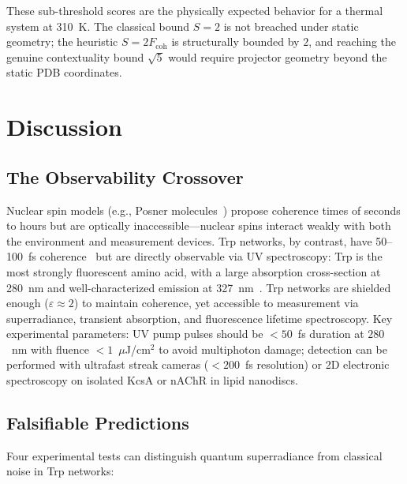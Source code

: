 \documentclass[aps,pre,twocolumn,showpacs,superscriptaddress]{revtex4-2}
\begin{document}
These sub-threshold scores are the physically expected behavior for a thermal system at 310~K. The classical bound $S=2$ is not breached under static geometry; the heuristic $S = 2F_{\mathrm{coh}}$ is structurally bounded by $2$, and reaching the genuine contextuality bound $\sqrt{5}$ would require projector geometry beyond the static PDB coordinates.


\section{Discussion}

\subsection{The Observability Crossover}

Nuclear spin models (e.g., Posner molecules~\cite{Fisher2015}) propose coherence times of seconds to hours but are optically inaccessible---nuclear spins interact weakly with both the environment and measurement devices. Trp networks, by contrast, have 50--100~fs coherence~\cite{Babcock2024} but are directly observable via UV spectroscopy: Trp is the most strongly fluorescent amino acid, with a large absorption cross-section at 280~nm and well-characterized emission at 327~nm~\cite{Lakowicz2006}. Trp networks are shielded enough ($\varepsilon \approx 2$) to maintain coherence, yet accessible to measurement via superradiance, transient absorption, and fluorescence lifetime spectroscopy. Key experimental parameters: UV pump pulses should be $<50$~fs duration at $280$~nm with fluence $<1$~$\mu$J/cm$^2$ to avoid multiphoton damage; detection can be performed with ultrafast streak cameras ($<200$~fs resolution) or 2D electronic spectroscopy on isolated KcsA or nAChR in lipid nanodiscs.

\subsection{Falsifiable Predictions}

Four experimental tests can distinguish quantum superradiance from classical noise in Trp networks:
\end{document}
